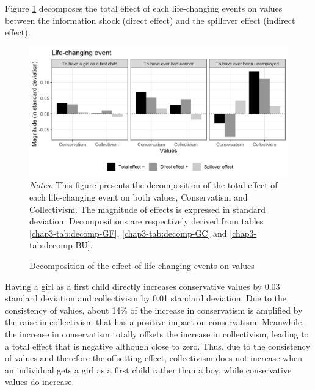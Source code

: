 Figure \ref{chap3-fig:sem-decomp-v5-base} decomposes the total effect of each life-changing events on values between the information shock (direct effect) and the spillover effect (indirect effect).
\begin{figure}[!tb]
    \centering
    \caption{Decomposition of the effect of life-changing events on values}
    \label{chap3-fig:sem-decomp-v5-base}
    \includegraphics[width=\linewidth]{chap3/graphic/decomp-v5-base.png}
    \hrulefill
	\vspace{-3em}
	\justify\singlespacing\footnotesize{\textit{Notes:} This figure presents the decomposition of the total effect of each life-changing event on both values, Conservatism and Collectivism. The magnitude of effects is expressed in standard deviation. Decompositions are respectively derived from tables \ref{chap3-tab:decomp-GF}, \ref{chap3-tab:decomp-GC} and \ref{chap3-tab:decomp-BU}.}
\end{figure}
Having a girl as a first child directly increases conservative values by 0.03 standard deviation and collectivism by 0.01 standard deviation. Due to the consistency of values, about 14\% of the increase in conservatism is amplified by the raise in collectivism that has a positive impact on conservatism. Meanwhile, the increase in conservatism totally offsets the increase in collectivism, leading to a total effect that is negative although close to zero. Thus, due to the consistency of values and therefore the offsetting effect, collectivism does not increase when an individual gets a girl as a first child rather than a boy, while conservative values do increase. %

